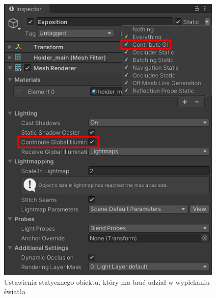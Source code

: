 \begin{figure}[h]
    \centering
    \includegraphics[scale=0.4]{Images/contributeGI.png}
    \caption{Ustawienia statycznego obiektu, który ma brać udział w wypiekaniu światła}
\end{figure}


